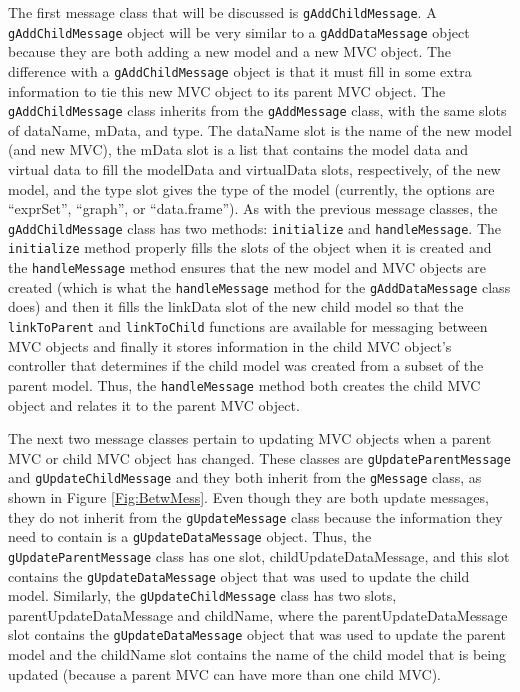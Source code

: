 \documentclass{article}[11pt]
\newcommand{\Rfunction}[1]{{\texttt{#1}}}
\newcommand{\Robject}[1]{{\texttt{#1}}}
\begin{document}
The first message class that will be discussed is \Robject{gAddChildMessage}.
A \Robject{gAddChildMessage} object will be very similar to a
\Robject{gAddDataMessage} object because they are both adding a new
model and a new MVC object.  The difference with a \Robject{gAddChildMessage}
object is that it must fill in some extra information to tie this new MVC
object to its parent MVC object.  The \Robject{gAddChildMessage} class
inherits from the \Robject{gAddMessage} class, with the same slots of
dataName, mData, and type.  The dataName slot is the name of the new model (and
new MVC), the mData slot is a list that contains the model data and virtual
data to fill the modelData and virtualData slots, respectively, of the new
model, and the type slot gives the type of the model (currently, the options
are ``exprSet'', ``graph'', or ``data.frame'').  As with the previous message
classes, the \Robject{gAddChildMessage} class has two methods:
\Rfunction{initialize} and \Rfunction{handleMessage}.  The
\Rfunction{initialize} method properly fills the slots of the object when it
is created and the \Rfunction{handleMessage} method ensures that the new model
and MVC objects are created (which is what the \Rfunction{handleMessage}
method for the \Robject{gAddDataMessage} class does) and then it fills the
linkData slot of the new child model so that the \Rfunction{linkToParent} and
\Rfunction{linkToChild} functions are available for messaging between MVC
objects and finally it stores information in the child MVC object's controller
that determines if the child model was created from a subset of the parent
model.  Thus, the \Rfunction{handleMessage} method both creates the child MVC
object and relates it to the parent MVC object.

The next two message classes pertain to updating MVC objects when a parent MVC
or child MVC object has changed.  These classes are
\Robject{gUpdateParentMessage} and \Robject{gUpdateChildMessage} and they both
inherit from the \Robject{gMessage} class, as shown in Figure
\ref{Fig:BetwMess}.  Even though they are both update messages, they do not
inherit from the \Robject{gUpdateMessage} class because the information they
need to contain is a \Robject{gUpdateDataMessage} object.  Thus, the
\Robject{gUpdateParentMessage} class has one slot, childUpdateDataMessage, and
this slot contains the \Robject{gUpdateDataMessage} object that was used to
update the child model.  Similarly, the \Robject{gUpdateChildMessage} class
has two slots, parentUpdateDataMessage and childName, where the
parentUpdateDataMessage slot contains the \Robject{gUpdateDataMessage} object
that was used to update the parent model and the childName slot contains the
name of the child model that is being updated (because a parent MVC can have
more than one child MVC). 
\end{document}
